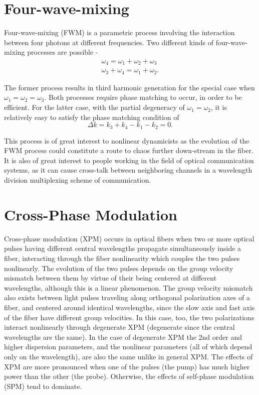 \section{Four-wave-mixing}

Four-wave-mixing (FWM) \cite{Agrawal10} is a parametric process involving
the interaction
between four photons at different frequencies. Two different kinds of
four-wave-mixing processes are possible -
\begin{eqnarray}
\omega_4 = \omega_1 + \omega_2 + \omega_3 \\
\omega_3 + \omega_4 = \omega_1 + \omega_2 .
\end{eqnarray}

The former process results in third harmonic generation for the special case
when $\omega_1 = \omega_2 = \omega_3$. Both processes require phase
matching to occur, in order to be efficient. For the latter case, with
the partial degeneracy of $\omega_1 = \omega_2$, it is relatively easy
to satisfy the phase matching condition of
\begin{equation}
\Delta k = k_3 + k_4 - k_1 - k_2 = 0 .
\end{equation}

This process is of great interest to nonlinear dynamicists as the
evolution of the FWM process could constitute a route to chaos further
down-stream in the fiber. It is also of great interest to people working in
the field of optical communication systems, as it can cause cross-talk
between neighboring channels in a wavelength division multiplexing scheme
of communication.

\section{Cross-Phase Modulation}

Cross-phase modulation (XPM) \cite{Agrawal7} occurs in optical fibers when
two or more optical pulses having different central wavelengths propagate
simultaneously inside a fiber, interacting through the fiber
nonlinearity which couples the two pulses nonlinearly.  The evolution of the
two pulses depends on the group velocity mismatch between them by virtue of
their being centered at different wavelengths, although this is a linear
phenomenon. The group velocity mismatch also exists between light pulses
traveling along orthogonal polarization axes of a fiber, and centered around
identical wavelengths, since the slow axis and fast axis of the fiber have
different group velocities. In this case, too, the two polarizations interact
nonlinearly \cite{Agrawal6} through degenerate XPM (degenerate since the
central wavelengths are the same). In the case of degenerate XPM the 2nd order
and higher dispersion parameters, and the nonlinear parameters (all of which
depend only on the wavelength), are also the same unlike in general XPM. The
effects of XPM are more pronounced when one of the pulses (the pump) has much
higher power than the other (the probe). Otherwise, the effects of self-phase
modulation (SPM) tend to dominate.

